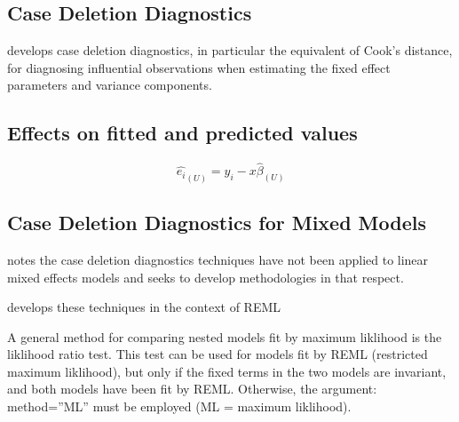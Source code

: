\documentclass[12pt, a4paper]{report}
\theoremstyle{plain}
\theoremstyle{definition}
\theoremstyle{remark}
\begin{document}
	
	
	
	
	

	\subsection{Case Deletion Diagnostics} %
	
	
	\citet{CPJ} develops  case deletion diagnostics, in particular the equivalent of  Cook's distance, for diagnosing influential observations when estimating the fixed effect parameters and variance components.
	
	\subsection{Effects on fitted and predicted values}
	\begin{equation}
	\hat{e_{i}}_{(U)} = y_{i} - x\hat{\beta}_{(U)}
	\end{equation}
	
	
	
	
	\subsection{Case Deletion Diagnostics for Mixed Models}
	
	\citet{Christiansen} notes the case deletion diagnostics techniques have not been applied to linear mixed effects models and seeks to develop methodologies in that respect.
	
	\citet{Christiansen} develops these techniques in the context of REML
	

	
	
	
	A general method for comparing nested models fit by maximum liklihood is the liklihood ratio 
	test. This test can be used for models fit by REML (restricted maximum liklihood), but only if the 
	fixed terms in the two models are invariant, and both models have been fit by REML. Otherwise, 
	the argument: method=”ML” must be employed (ML = maximum liklihood). 
	
\end{document}
